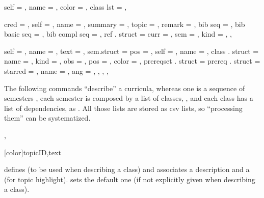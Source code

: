 \documentclass[article,nogeometry,english,tocdepth=3,secdepth=3]{ufrgscca} %
\begin{document}
\begin{codestore}[st=topicsdef]
  {
    self  = , name = , color = , class lst = , %
  }
\end{codestore}

\label{topics-def}


\begin{codestore}[st=classdef]
  {
   cred = , self = , name = , summary = , topic = , remark = ,
   bib seq = ,  bib basic seq = ,  bib compl seq = ,
   ref . struct = {
     curr = , sem = , kind = ,
   } ,
  }
\end{codestore}

\label{class-def}

\begin{codestore}[st=curriculadef]
  {
    self = , name = , text = ,
    sem.struct = {
      pos = , self = , name = ,
      class . struct = {
        name = , kind = , obs = , pos = , color = ,
        prereqset . struct = {
          prereq . struct = {
            starred = , name = , ang = ,
          }
        } ,
      } ,
    } ,
  }
\end{codestore}

\label{curricula-def}


The following commands “describe” a curricula, whereas one is a sequence of semesters , each semester is composed by a list of classes, , and each class has a list of dependencies,  as \tsmacro{\depdef}{}. All those lists are stored as csv lists, so “processing them” can be systematized.

\begin{codedescribe}{\topicdef,}
\begin{codesyntax}%
    \tsmacro{\topicdef}[color]{topicID,text}
\end{codesyntax}
\tsmacro{\topicdef}{} defines  (to be used when describing a class) and associates a  description and a  (for topic highlight).  sets the default one (if not explicitly given when describing a class).
\end{codedescribe}
\end{document}
